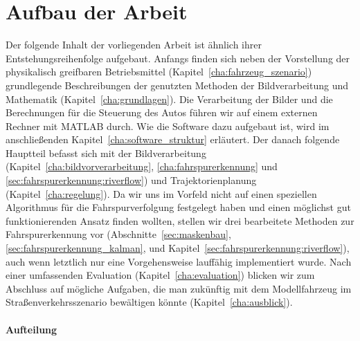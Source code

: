 \section{Aufbau der Arbeit \dcfirstauthorshort}

Der folgende Inhalt der vorliegenden Arbeit ist ähnlich ihrer Entstehungsreihenfolge aufgebaut. Anfangs finden sich neben der Vorstellung der physikalisch greifbaren Betriebsmittel (Kapitel~\ref{cha:fahrzeug_szenario}) grundlegende Beschreibungen der genutzten Methoden der Bildverarbeitung und Mathematik (Kapitel~\ref{cha:grundlagen}). Die Verarbeitung der Bilder und die Berechnungen für die Steuerung des Autos führen wir auf einem externen Rechner mit MATLAB durch. Wie die Software dazu aufgebaut ist, wird im anschließenden Kapitel~\ref{cha:software_struktur} erläutert. Der danach folgende Hauptteil befasst sich mit der Bildverarbeitung (Kapitel~\ref{cha:bildvorverarbeitung}, \ref{cha:fahrspurerkennung} und \ref{sec:fahrspurerkennung:riverflow}) und Trajektorienplanung (Kapitel~\ref{cha:regelung}). Da wir uns im Vorfeld nicht auf einen speziellen Algorithmus für die Fahrspurverfolgung festgelegt haben und einen möglichst gut funktionierenden Ansatz finden wollten, stellen wir drei bearbeitete Methoden zur Fahrspurerkennung vor (Abschnitte~\ref{sec:maskenbau}, \ref{sec:fahrspurerkennung_kalman}, und Kapitel~\ref{sec:fahrspurerkennung:riverflow}), auch wenn letztlich nur eine Vorgehensweise lauffähig implementiert wurde. Nach einer umfassenden Evaluation (Kapitel~\ref{cha:evaluation}) blicken wir zum Abschluss auf mögliche Aufgaben, die man zukünftig mit dem Modellfahrzeug im Straßenverkehrsszenario bewältigen könnte (Kapitel~\ref{cha:ausblick}).

\paragraph{Aufteilung \dcsecondauthorshort}

